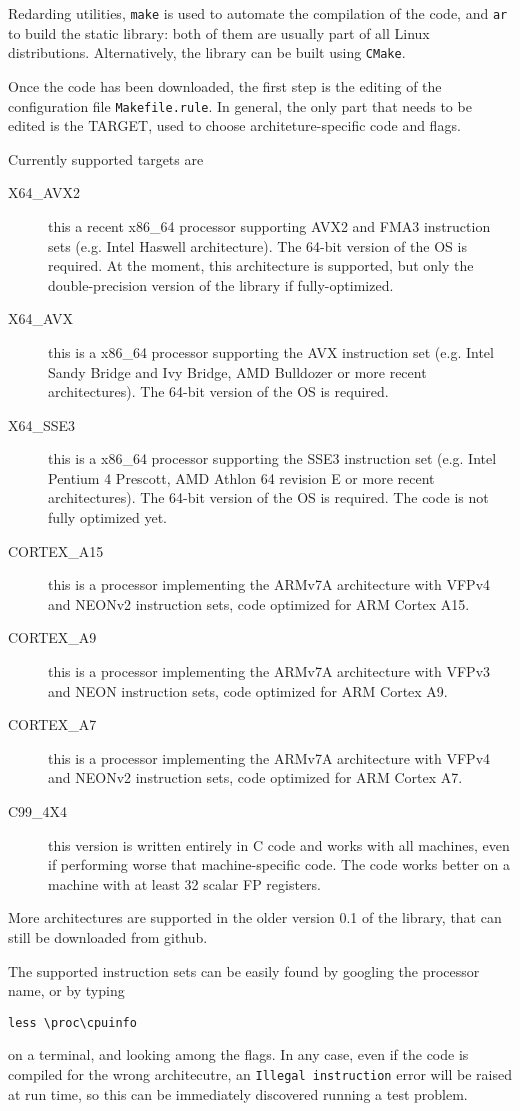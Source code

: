 \documentclass[a4paper]{report}
\begin{document}
Redarding utilities, {\tt make} is used to automate the compilation of the code, and {\tt ar} to build the static library: both of them are usually part of all Linux distributions.
Alternatively, the library can be built using {\tt CMake}.

Once the code has been downloaded, the first step is the editing of the configuration file {\tt Makefile.rule}.
In general, the only part that needs to be edited is the TARGET, used to choose architeture-specific code and flags.

Currently supported targets are
\begin{description}
\item[X64\_AVX2] this a recent x86\_64 processor supporting AVX2 and FMA3 instruction sets (e.g. Intel Haswell architecture). 
The 64-bit version of the OS is required. 
At the moment, this architecture is supported, but only the double-precision version of the library if fully-optimized.
\item[X64\_AVX] this is a x86\_64 processor supporting the AVX instruction set (e.g. Intel Sandy Bridge and Ivy Bridge, AMD Bulldozer or more recent architectures). The 64-bit version of the OS is required.
\item[X64\_SSE3] this is a x86\_64 processor supporting the SSE3 instruction set (e.g. Intel Pentium 4 Prescott, AMD Athlon 64 revision E or more recent architectures). The 64-bit version of the OS is required. The code is not fully optimized yet.
\item[CORTEX\_A15] this is a processor implementing the ARMv7A architecture with VFPv4 and NEONv2 instruction sets, code optimized for ARM Cortex A15.
\item[CORTEX\_A9] this is a processor implementing the ARMv7A architecture with VFPv3 and NEON instruction sets, code optimized for ARM Cortex A9.
\item[CORTEX\_A7] this is a processor implementing the ARMv7A architecture with VFPv4 and NEONv2 instruction sets, code optimized for ARM Cortex A7.
\item[C99\_4X4] this version is written entirely in C code and works with all machines, even if performing worse that machine-specific code. The code works better on a machine with at least 32 scalar FP registers.
\end{description}
More architectures are supported in the older version 0.1 of the library, that can still be downloaded from github.

The supported instruction sets can be easily found by googling the processor name, or by typing
\begin{verbatim}
less \proc\cpuinfo
\end{verbatim}
on a terminal, and looking among the flags. 
In any case, even if the code is compiled for the wrong architecutre, an {\tt Illegal instruction} error will be raised at run time, so this can be immediately discovered running a test problem.
\end{document}
